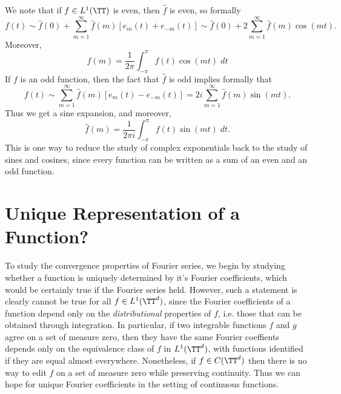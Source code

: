 \begin{remark}
    We note that if $f \in L^1(\TT)$ is even, then $\widehat{f}$ is even, so formally
    \[ f(t) \sim \widehat{f}(0) + \sum_{m = 1}^\infty \widehat{f}(m) [e_m(t) + e_{-m}(t)] \sim \widehat{f}(0) + 2 \sum_{m = 1}^\infty \widehat{f}(m) \cos(mt). \]
    Moreover,
    \[ \widehat{f}(m) = \frac{1}{2\pi} \int_{-\pi}^\pi f(t) \cos(mt)\; dt \]
    If $f$ is an odd function, then the fact that $\widehat{f}$ is odd implies formally that
    \[ f(t) \sim \sum_{m = 1}^\infty \widehat{f}(m) [e_m(t) - e_{-m}(t)] = 2i \sum_{m = 1}^\infty \widehat{f}(m) \sin(mt). \]
    Thus we get a sine expansion, and moreover,
    \[ \widehat{f}(m) = \frac{1}{2\pi i} \int_{-\pi}^\pi f(t) \sin(mt)\; dt. \]
    This is one way to reduce the study of complex exponentials back to the study of sines and cosines, since every function can be written as a sum of an even and an odd function.
\end{remark}

\section{Unique Representation of a Function?}

To study the convergence properties of Fourier series, we begin by studying whether a function is uniquely determined by it's Fourier coefficients, which would be certainly true if the Fourier series held. However, such a statement is clearly cannot be true for all $f \in L^1(\TT^d)$, since the Fourier coefficients of a function depend only on the \emph{distributional} properties of $f$, i.e. those that can be obtained through integration. In particular, if two integrable functions $f$ and $g$ agree on a set of measure zero, then they have the same Fourier coeffients depends only on the equivalence class of $f$ in $L^1(\TT^d)$, with functions identified if they are equal almost everywhere. Nonetheless, if $f \in C(\TT^d)$ then there is no way to edit $f$ on a set of measure zero while preserving continuity. Thus we can hope for unique Fourier coefficients in the setting of continuous functions.

